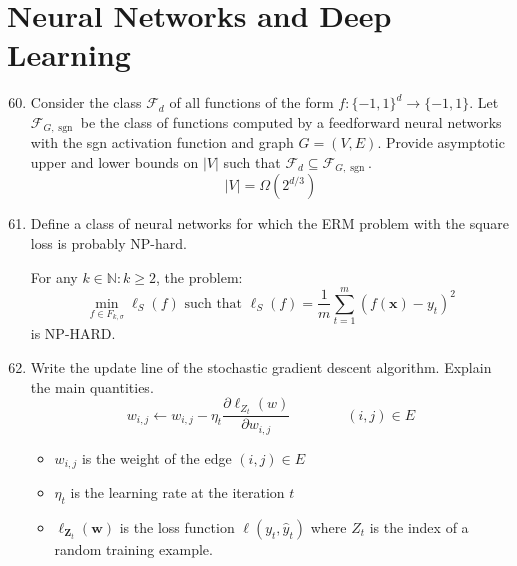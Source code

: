 \documentclass[a4paper]{article}
\newcommand{\F}{\ensuremath{\mathcal{F}}}
\newcommand{\N}{\ensuremath{\mathbb{N}}}
\DeclareMathOperator*{\sgn}{sgn}
\begin{document}
\section{Neural Networks and Deep Learning}
\begin{enumerate}
    \setcounter{enumi}{59}
    \item Consider the class $\F_d$ of all functions of the form $f:\{−1,1\}^d\to\{−1,1\}$.
    Let $\F_{G,\sgn}$ be the class of functions computed by a feedforward neural networks
    with the sgn activation function and graph $G=(V, E)$. Provide asymptotic upper and
    lower bounds on $|V|$ such that $\F_d\subseteq\F_{G,\sgn}$.
    $$ |V| = \Omega(2^{d/3}) $$
    \item Define a class of neural networks for which the ERM problem with the square 
    loss is probably NP-hard.

    For any $k\in\N: k\geq 2 $, the problem:
    $$ \min_{f\in F_{k,\sigma}} \ell_S(f) \text{ such that }
    \ell_S(f) = \frac{1}{m}\sum_{t=1}^{m}(f(\bm x)-y_t)^2 $$
    is NP-HARD.
    \item Write the update line of the stochastic gradient descent algorithm. Explain the
    main quantities.
    $$ w_{i,j} \leftarrow w_{i,j}-\eta_t\frac{\partial \ell_{Z_t}(w)}{\partial w_{i,j}} 
    \qquad\qquad (i,j)\in E$$
    \begin{itemize}
        \item $w_{i,j}$ is the weight of the edge $(i,j)\in E$
        \item $\eta_t$ is the learning rate at the iteration $t$
        \item $\ell_{\bm Z_t}(\bm w)$ is the loss function $\ell(y_t,\hat{y}_t)$ where
            $Z_t$ is the index of a random training example.
    \end{itemize}
\end{enumerate}
\end{document}

